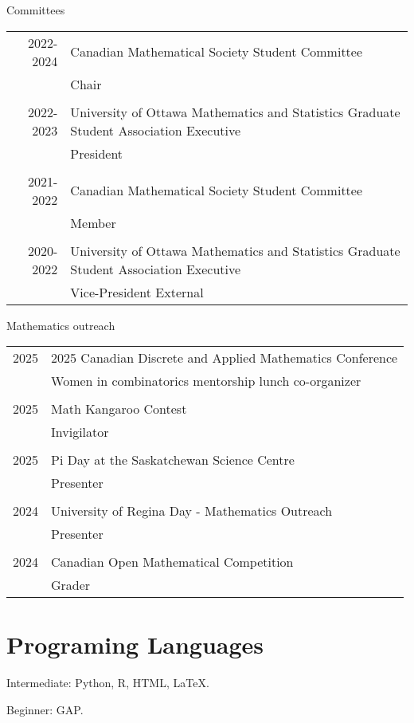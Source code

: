 \documentclass[letter,12pt]{article} %
\begin{document}
{\large Committees}

\begin{longtable}{r p{13.5cm}}
2022-2024 &Canadian Mathematical Society Student Committee\\
&Chair\\
& \\[-3mm]
2022-2023 &University of Ottawa Mathematics and Statistics Graduate Student Association Executive \\
&President \\
& \\[-3mm]
2021-2022 &Canadian Mathematical Society Student Committee\\
&Member\\
& \\[-3mm]
 2020-2022 &  University of Ottawa Mathematics and Statistics Graduate Student Association Executive   \\
&Vice-President External \\
\end{longtable}

{\large Mathematics outreach}

\begin{longtable}{r p{13.5cm}}
2025 &2025 Canadian Discrete and Applied Mathematics Conference \\
&Women in combinatorics mentorship lunch co-organizer\\
& \\[-3mm]
2025 &Math Kangaroo Contest \\
&Invigilator \\
& \\[-3mm]
 2025 &  Pi Day at the Saskatchewan Science Centre  \\
&Presenter \\
& \\[-3mm]
 2024 & University of Regina Day - Mathematics Outreach   \\
&Presenter \\
& \\[-3mm]
2024 & Canadian Open Mathematical Competition  \\
& Grader\\
\end{longtable}




\section{Programing Languages}

\vspace{3mm}

Intermediate: Python, R, HTML, \LaTeX.

Beginner: GAP.

\end{document}
